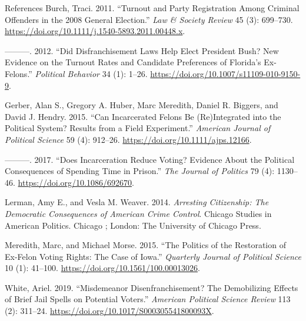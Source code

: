 \documentclass[
  ignorenonframetext,
]{beamer}
\newlength{\cslhangindent}
\newenvironment{cslreferences}%
  {\setlength{\parindent}{0pt}%
  \everypar{\setlength{\hangindent}{\cslhangindent}}\ignorespaces}%
  {\par}
\begin{document}
\begin{frame}{References}
\protect\hypertarget{references}{}
\hypertarget{refs}{}
\begin{cslreferences}
\leavevmode\hypertarget{ref-Burch2011}{}%
Burch, Traci. 2011. ``Turnout and Party Registration Among Criminal
Offenders in the 2008 General Election.'' \emph{Law \& Society Review}
45 (3): 699--730.
\url{https://doi.org/10.1111/j.1540-5893.2011.00448.x}.

\leavevmode\hypertarget{ref-Burch2012}{}%
---------. 2012. ``Did Disfranchisement Laws Help Elect President Bush?
New Evidence on the Turnout Rates and Candidate Preferences of Florida's
Ex-Felons.'' \emph{Political Behavior} 34 (1): 1--26.
\url{https://doi.org/10.1007/s11109-010-9150-9}.

\leavevmode\hypertarget{ref-Gerber2015}{}%
Gerber, Alan S., Gregory A. Huber, Marc Meredith, Daniel R. Biggers, and
David J. Hendry. 2015. ``Can Incarcerated Felons Be (Re)Integrated into
the Political System? Results from a Field Experiment.'' \emph{American
Journal of Political Science} 59 (4): 912--26.
\url{https://doi.org/10.1111/ajps.12166}.

\leavevmode\hypertarget{ref-Gerber2017}{}%
---------. 2017. ``Does Incarceration Reduce Voting? Evidence About the
Political Consequences of Spending Time in Prison.'' \emph{The Journal
of Politics} 79 (4): 1130--46. \url{https://doi.org/10.1086/692670}.

\leavevmode\hypertarget{ref-Lerman2014}{}%
Lerman, Amy E., and Vesla M. Weaver. 2014. \emph{Arresting Citizenship:
The Democratic Consequences of American Crime Control}. Chicago Studies
in American Politics. Chicago ; London: The University of Chicago Press.

\leavevmode\hypertarget{ref-Meredith2015}{}%
Meredith, Marc, and Michael Morse. 2015. ``The Politics of the
Restoration of Ex-Felon Voting Rights: The Case of Iowa.''
\emph{Quarterly Journal of Political Science} 10 (1): 41--100.
\url{https://doi.org/10.1561/100.00013026}.

\leavevmode\hypertarget{ref-White2019}{}%
White, Ariel. 2019. ``Misdemeanor Disenfranchisement? The Demobilizing
Effects of Brief Jail Spells on Potential Voters.'' \emph{American
Political Science Review} 113 (2): 311--24.
\url{https://doi.org/10.1017/S000305541800093X}.
\end{cslreferences}
\end{frame}
\end{document}
